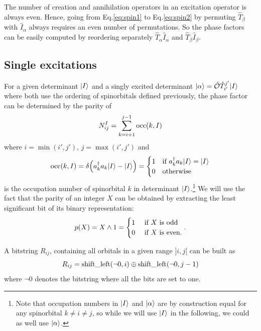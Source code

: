 \documentclass[./thesis.tex]{subfiles}
\begin{document}
The number of creation and annihilation operators in an excitation operator is always even. Hence, going from Eq.\eqref{eq:spin1} to Eq.\eqref{eq:spin2} by permuting $\hat{T}_\beta$ with $\hat{I}_\alpha$ always requires an even number of permutations.
So the phase factors can be easily computed by reordering separately $\hat{T}_\alpha \hat{I}_\alpha$ and $\hat{T}_\beta  \hat{I}_\beta$.



\subsection{Single excitations}


For a given determinant ${\ket{I}}$ and a singly excited determinant ${\ket{\alpha}} = {\hat{\mathcal{O}}} {\hat{T}_{i'}^{j'}} {\ket{I}}$ where both 
use the ordering of spinorbitals defined previously, the phase factor can be determined by the parity of
\begin{equation}
N^{I}_{ij}=\sum_{k=i+1}^{j-1} {\text{occ}(k,I)}
\end{equation}
where $i=\min(i',j')$, $j=\max(i',j')$ and
\begin{equation}
{\text{occ}(k,I)} = \delta \qty(a^\dagger_{k}a_{k} {\ket{I}} - {\ket{I}}) = \begin{cases}
 1 & \text{if } a^\dagger_{k}a_{k} {\ket{I}} = {\ket{I}} \\
 0 & \text{otherwise}
\end{cases}
\end{equation}
is the occupation number of spinorbital $k$ in determinant ${\ket{I}}$.\footnote{Note that occupation
numbers in ${\ket{I}}$ and ${\ket{\alpha}}$ are by construction equal for any spinorbital $k \neq i \neq j$, so while we will use ${\ket{I}}$ in the following, we could as well use ${\ket{\alpha}}$.
}
We will use the fact that the parity of an integer $X$ can be obtained by extracting the least significant bit of its binary representation: 
\begin{equation}
p(X)=X \wedge 1 = \begin{cases}
1 & \text{ if $X$ is odd  } \\
0 & \text{ if $X$ is even.} 
\end{cases}.
\end{equation}


A bitstring $R_{ij}$, containing all orbitals in a given range $]i, j[$ can be built as 
\begin{equation}
R_{ij}=\text{shift\_left}(\neg{0},i) \oplus \text{shift\_left}(\neg{0},j-1)
\end{equation}
where $\neg{0}$ denotes the bitstring where all the bits are set to one.
\end{document}

